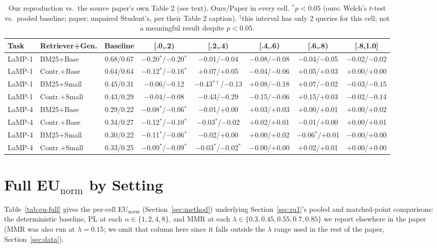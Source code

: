 \documentclass[10pt,twocolumn]{article}
\begin{document}
\begin{table}[t]
\centering
\scriptsize
\caption{Our reproduction vs.\ the source paper's own Table 2 (see text),
Ours/Paper in every cell. $^*p{<}0.05$ (ours: Welch's $t$-test vs.\ pooled
baseline; paper: unpaired Student's, per their Table 2 caption). $^\dagger$this
interval has only 2 queries for this cell; not a meaningful result despite
$p{<}0.05$.}
\label{tab:baseline}
\begin{tabular}{@{}llcccccc@{}}
\toprule
Task & Retriever+Gen. & Baseline & [.0,.2) & [.2,.4) & [.4,.6) & [.6,.8) & [.8,1.0] \\
\midrule
LaMP-1 & BM25+Base   & 0.68/0.67 & $-$0.20$^{*}$/$-$0.20$^{*}$ & $-$0.01/$-$0.04 & $-$0.08/$-$0.08 & $-$0.04/$-$0.05 & $-$0.02/$-$0.02 \\
LaMP-1 & Contr.+Base & 0.64/0.64 & $-$0.12$^{*}$/$-$0.16$^{*}$ & $+$0.07/$+$0.05 & $-$0.04/$-$0.06 & $+$0.05/$+$0.03 & $+$0.00/$+$0.00 \\
LaMP-1 & BM25+Small  & 0.45/0.31 & $-$0.06/$-$0.12 & $-$0.43$^{*\dagger}$/$-$0.13 & $+$0.08/$-$0.18 & $+$0.07/$-$0.02 & $-$0.03/$-$0.15 \\
LaMP-1 & Contr.+Small& 0.43/0.29 & $-$0.04/$-$0.08 & $-$0.43/$-$0.29 & $-$0.15/$-$0.06 & $+$0.15/$+$0.03 & $-$0.02/$-$0.14 \\
\midrule
LaMP-4 & BM25+Base   & 0.29/0.22 & $-$0.08$^{*}$/$-$0.06$^{*}$ & $-$0.01/$+$0.00 & $+$0.03/$+$0.03 & $+$0.00/$+$0.01 & $+$0.00/$+$0.02 \\
LaMP-4 & Contr.+Base & 0.34/0.27 & $-$0.12$^{*}$/$-$0.10$^{*}$ & $-$0.03$^{*}$/$-$0.02 & $+$0.02/$+$0.01 & $-$0.01/$+$0.00 & $+$0.00/$+$0.01 \\
LaMP-4 & BM25+Small  & 0.30/0.22 & $-$0.11$^{*}$/$-$0.06$^{*}$ & $-$0.02/$+$0.00 & $+$0.00/$+$0.02 & $-$0.06$^{*}$/$+$0.01 & $-$0.00/$+$0.00 \\
LaMP-4 & Contr.+Small& 0.33/0.25 & $-$0.09$^{*}$/$-$0.09$^{*}$ & $-$0.03$^{*}$/$-$0.02$^{*}$ & $-$0.00/$+$0.00 & $+$0.02/$+$0.01 & $+$0.00/$+$0.00 \\
\bottomrule
\end{tabular}
\end{table}

\section{Full EU$_{\text{norm}}$ by Setting}
\label{app:eu-full}

Table~\ref{tab:eu-full} gives the per-cell EU$_{\text{norm}}$ (Section~\ref{sec:method})
underlying Section~\ref{sec:rq1}'s pooled and matched-point comparisons: the
deterministic baseline, PL at each $\alpha \in \{1,2,4,8\}$, and MMR at each
$\lambda \in \{0.3,0.45,0.55,0.7,0.85\}$ we report elsewhere in the paper (MMR was
also run at $\lambda{=}0.15$; we omit that column here since it falls outside the
$\lambda$ range used in the rest of the paper, Section~\ref{sec:data}).
\end{document}

